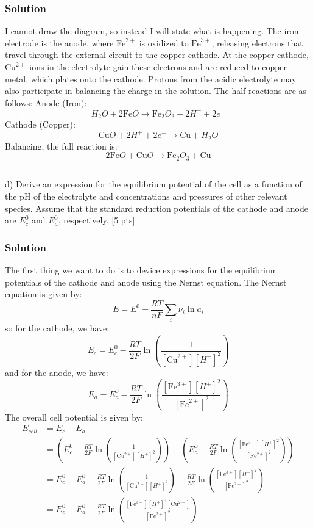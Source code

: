 \documentclass[12pt]{article}
\begin{document}
\subsubsection{Solution}
I cannot draw the diagram, so instead I will state what is happening. The iron electrode is the anode, where $\mathrm{Fe}^{2+}$ is oxidized to $\mathrm{Fe}^{3+}$, releasing electrons that travel through the external circuit to the copper cathode. At the copper cathode, $\mathrm{Cu}^{2+}$ ions in the electrolyte gain these electrons and are reduced to copper metal, which plates onto the cathode. Protons from the acidic electrolyte may also participate in balancing the charge in the solution. The half reactions are as follows:
Anode (Iron): \[H_2O + 2\mathrm{Fe}O \rightarrow \mathrm{Fe}_2O_3 + 2H^+ + 2e^-\]
Cathode (Copper): \[\mathrm{Cu}O + 2H^+ + 2e^- \rightarrow \mathrm{Cu} + H_2O\]
Balancing, the full reaction is:
\[2\mathrm{Fe}O + \mathrm{Cu}O \rightarrow \mathrm{Fe}_2O_3 + \mathrm{Cu}\]
\subsection{}
d) Derive an expression for the equilibrium potential of the cell as a function of the pH of the electrolyte and concentrations and pressures of other relevant species. Assume that the standard reduction potentials of the cathode and anode are $E_{c}^{0}$ and $E_{a}^{0}$, respectively. [5 pts]\\[0pt]
\subsubsection{Solution}
The first thing we want to do is to device expressions for the equilibrium potentials of the cathode and anode using the Nernst equation. The Nernst equation is given by:
\begin{equation}
E = E^0 - \frac{RT}{nF} \sum_i \nu_i \ln a_i
\end{equation}
so for the cathode, we have:
\begin{equation}
E_c = E_c^0 - \frac{RT}{2F} \ln \left( \frac{1}{[\mathrm{Cu}^{2+}][H^+]^2} \right)
\end{equation}
and for the anode, we have:
\begin{equation}
E_a = E_a^0 - \frac{RT}{2F} \ln \left( \frac{[\mathrm{Fe}^{3+}][H^+]^2}{[\mathrm{Fe}^{2+}]^2} \right)
\end{equation}
The overall cell potential is given by:
\begin{align}
E_{cell} &= E_c - E_a \\
&= \left( E_c^0 - \frac{RT}{2F} \ln \left( \frac{1}{[\mathrm{Cu}^{2+}][H^+]^2} \right) \right) - \left( E_a^0 - \frac{RT}{2F} \ln \left( \frac{[\mathrm{Fe}^{3+}][H^+]^2}{[\mathrm{Fe}^{2+}]^2} \right) \right) \\
&= E_c^0 - E_a^0 - \frac{RT}{2F} \ln \left( \frac{1}{[\mathrm{Cu}^{2+}][H^+]^2} \right) + \frac{RT}{2F} \ln \left( \frac{[\mathrm{Fe}^{3+}][H^+]^2}{[\mathrm{Fe}^{2+}]^2} \right) \\
&= E_c^0 - E_a^0 - \frac{RT}{2F} \ln \left( \frac{[\mathrm{Fe}^{3+}][H^+]^4[\mathrm{Cu}^{2+}]}{[\mathrm{Fe}^{2+}]^2} \right)
\end{align}
\end{document}
